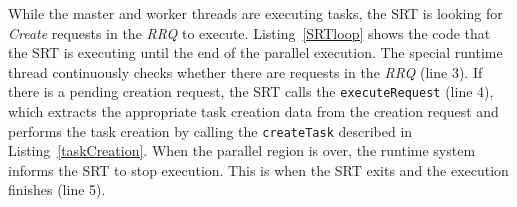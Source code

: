 While the master and worker threads are executing tasks, the SRT is looking for \textit{Create} requests in the \textit{RRQ} to execute.
Listing~\ref{SRTloop} shows the code that the SRT is executing until the end of the parallel execution.
The special runtime thread continuously checks whether there are requests in the \textit{RRQ} (line 3). 
If there is a pending creation request, the SRT calls the \texttt{executeRequest} (line 4), which extracts the appropriate task creation data from the creation request and performs the task creation by calling the \texttt{createTask} described in Listing~\ref{taskCreation}.
When the parallel region is over, the runtime system informs the SRT to stop execution.
This is when the SRT exits and the execution finishes (line 5).







